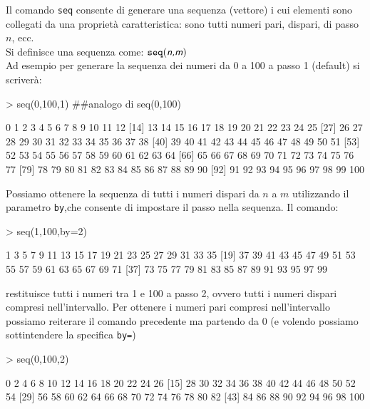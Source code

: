 \documentclass[onecolumn,11pt]{book}
\newcommand{\varia}[1]{\textsl{\textsf{#1}}}
\begin{document}
Il comando \texttt{seq} consente di generare una sequenza (vettore) i cui elementi sono collegati da una propriet\`a caratteristica: sono tutti numeri pari, dispari, di passo $n$, ecc.\\
Si definisce una sequenza come: $\texttt{seq}(\varia{n,m})$\\ %
Ad esempio per generare la sequenza dei numeri da 0 a 100 a passo 1 (default) si scriver\`a:
\begin{Schunk}
\begin{Sinput}
> seq(0,100,1) ##analogo di seq(0,100)
\end{Sinput}
\begin{Soutput}
  [1]   0   1   2   3   4   5   6   7   8   9  10  11  12
 [14]  13  14  15  16  17  18  19  20  21  22  23  24  25
 [27]  26  27  28  29  30  31  32  33  34  35  36  37  38
 [40]  39  40  41  42  43  44  45  46  47  48  49  50  51
 [53]  52  53  54  55  56  57  58  59  60  61  62  63  64
 [66]  65  66  67  68  69  70  71  72  73  74  75  76  77
 [79]  78  79  80  81  82  83  84  85  86  87  88  89  90
 [92]  91  92  93  94  95  96  97  98  99 100
\end{Soutput}
\end{Schunk}
Possiamo ottenere la sequenza di tutti i numeri dispari da $n$ a $m$ utilizzando il parametro \texttt{by},che consente di impostare il passo nella sequenza.
Il comando:
\begin{Schunk}
\begin{Sinput}
> seq(1,100,by=2)
\end{Sinput}
\begin{Soutput}
 [1]  1  3  5  7  9 11 13 15 17 19 21 23 25 27 29 31 33 35
[19] 37 39 41 43 45 47 49 51 53 55 57 59 61 63 65 67 69 71
[37] 73 75 77 79 81 83 85 87 89 91 93 95 97 99
\end{Soutput}
\end{Schunk}
restituisce tutti i numeri tra 1 e 100 a passo 2, ovvero tutti i numeri dispari compresi nell'intervallo.
Per ottenere i numeri pari compresi nell'intervallo possiamo reiterare il comando precedente ma partendo da 0 (e volendo possiamo sottintendere la specifica \texttt{by=})
\begin{Schunk}
\begin{Sinput}
> seq(0,100,2)
\end{Sinput}
\begin{Soutput}
 [1]   0   2   4   6   8  10  12  14  16  18  20  22  24  26
[15]  28  30  32  34  36  38  40  42  44  46  48  50  52  54
[29]  56  58  60  62  64  66  68  70  72  74  76  78  80  82
[43]  84  86  88  90  92  94  96  98 100
\end{Soutput}
\end{Schunk}
\end{document}
